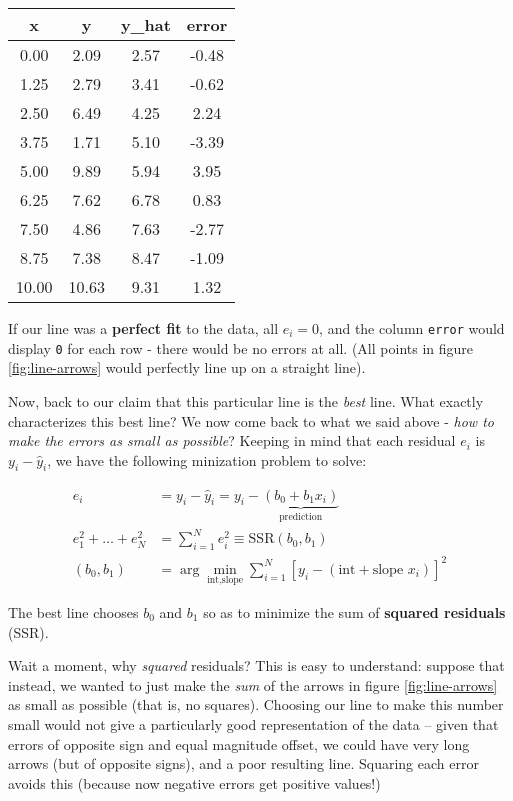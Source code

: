 \documentclass[]{book}
\newenvironment{warning}{\begin{tcolorbox}[colback=orange!5!white,colframe=orange]}{\end{tcolorbox}}
\begin{document}
\begin{tabular}{c|c|c|c}
\hline
x & y & y\_hat & error\\
\hline
0.00 & 2.09 & 2.57 & -0.48\\
\hline
1.25 & 2.79 & 3.41 & -0.62\\
\hline
2.50 & 6.49 & 4.25 & 2.24\\
\hline
3.75 & 1.71 & 5.10 & -3.39\\
\hline
5.00 & 9.89 & 5.94 & 3.95\\
\hline
6.25 & 7.62 & 6.78 & 0.83\\
\hline
7.50 & 4.86 & 7.63 & -2.77\\
\hline
8.75 & 7.38 & 8.47 & -1.09\\
\hline
10.00 & 10.63 & 9.31 & 1.32\\
\hline
\end{tabular}

If our line was a \textbf{perfect fit} to the data, all \(e_i = 0\), and the column \texttt{error} would display \texttt{0} for each row - there would be no errors at all. (All points in figure \ref{fig:line-arrows} would perfectly line up on a straight line).

Now, back to our claim that this particular line is the \emph{best} line. What exactly characterizes this best line? We now come back to what we said above - \emph{how to make the errors as small as possible}? Keeping in mind that each residual \(e_i\) is \(y_i - \hat{y}_i\), we have the following minization problem to solve:

\begin{align}
e_i & = y_i - \hat{y}_i = y_i - \underbrace{\left(b_0 + b_1 x_i\right)}_\text{prediction}\\
e_1^2 + \dots + e_N^2 &= \sum_{i=1}^N e_i^2 \equiv \text{SSR}(b_0,b_1) \\
(b_0,b_1) &= \arg \min_{\text{int},\text{slope}} \sum_{i=1}^N \left[y_i - \left(\text{int} + \text{slope } x_i\right)\right]^2 \label{eq:ols-min}
\end{align}

\begin{warning}
The best line chooses \(b_0\) and \(b_1\) so as to minimize the sum of
\textbf{squared residuals} (SSR).
\end{warning}

Wait a moment, why \emph{squared} residuals? This is easy to understand: suppose that instead, we wanted to just make the \emph{sum} of the arrows in figure \ref{fig:line-arrows} as small as possible (that is, no squares). Choosing our line to make this number small would not give a particularly good representation of the data -- given that errors of opposite sign and equal magnitude offset, we could have very long arrows (but of opposite signs), and a poor resulting line. Squaring each error avoids this (because now negative errors get positive values!)
\end{document}
